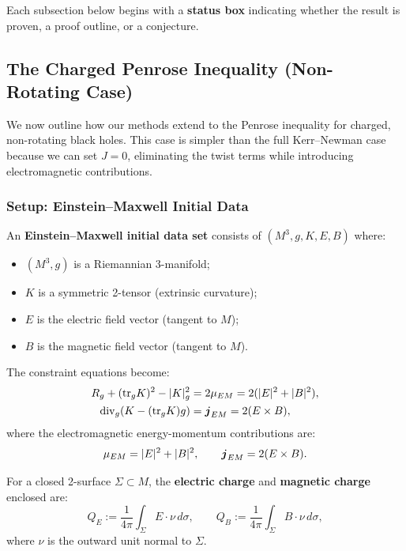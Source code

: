 Each subsection below begins with a \textbf{status box} indicating whether the result is proven, a proof outline, or a conjecture.
\subsection{The Charged Penrose Inequality (Non-Rotating Case)}\label{subsec:charged-penrose}

We now outline how our methods extend to the Penrose inequality for charged, non-rotating black holes. This case is simpler than the full Kerr--Newman case because we can set $J = 0$, eliminating the twist terms while introducing electromagnetic contributions.

\subsubsection{Setup: Einstein--Maxwell Initial Data}

\begin{definition}
An \textbf{Einstein--Maxwell initial data set} consists of $(M^3, g, K, E, B)$ where:
\begin{itemize}
    \item $(M^3, g)$ is a Riemannian 3-manifold;
    \item $K$ is a symmetric 2-tensor (extrinsic curvature);
    \item $E$ is the electric field vector (tangent to $M$);
    \item $B$ is the magnetic field vector (tangent to $M$).
\end{itemize}
The constraint equations become:
\begin{align}
    R_g + (\mathrm{tr}_g K)^2 - |K|_g^2 &= 2\mu_{EM} = 2(|E|^2 + |B|^2), \label{eq:hamiltonian-EM}\\
    \mathrm{div}_g(K - (\mathrm{tr}_g K)g) &= \boldsymbol{j}_{EM} = 2(E \times B), \label{eq:momentum-EM}
\end{align}
where the electromagnetic energy-momentum contributions are:
\begin{equation}
    \mu_{EM} = |E|^2 + |B|^2, \qquad \boldsymbol{j}_{EM} = 2(E \times B).
\end{equation}
\end{definition}

\begin{definition}
For a closed 2-surface $\Sigma \subset M$, the \textbf{electric charge} and \textbf{magnetic charge} enclosed are:
\begin{equation}
    Q_E := \frac{1}{4\pi}\int_\Sigma E \cdot \nu \, d\sigma, \qquad Q_B := \frac{1}{4\pi}\int_\Sigma B \cdot \nu \, d\sigma,
\end{equation}
where $\nu$ is the outward unit normal to $\Sigma$.
\end{definition}


